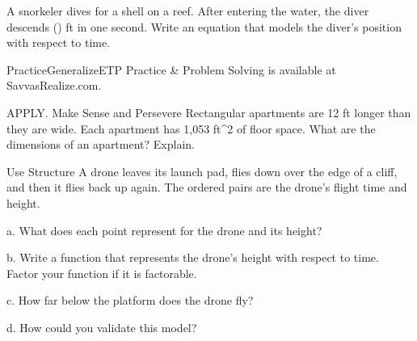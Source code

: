 \documentclass{article}
\newenvironment{practice}[2]{}{}        %
\newenvironment{te-addendum}[2]{}{}     %
\newcommand{\answer}[1]{}               %
\newcommand{\placeholder}[2]{}          %
\begin{document}
\begin{practice}{39}{3}
A snorkeler dives for a shell on a reef. After entering the water, the diver descends () ft in one second. Write an equation that models the diver's position with respect to time.
\placeholder{illustration}{Underwater reef with snorkeler shown entering at left, reaching shell on bottom center, and returning to surface at right. Black (x)-axis along water surface, arrows left and right; (y)-axis vertical near left, downward arrow and upward arrow, 0 at origin. Left pose labeled 1 sec, 0 ft; right pose labeled 11 sec, 0 ft. Fish and coral below.}
\answer{(y=(\frac{11}{27})(x-1)(x-11))}
\end{practice}
\begin{te-addendum}{Practice}{GeneralizeETP}
Practice \& Problem Solving is available at SavvasRealize.com.
\end{te-addendum}
\begin{practice}{40}{2}
APPLY. Make Sense and Persevere Rectangular apartments are 12 ft longer than they are wide. Each apartment has 1,053 ft^2 of floor space. What are the dimensions of an apartment? Explain.
\answer{39 ft by 27 ft; (x(x+12)=1053); (x^2+12x=1053); (x^2+12x-1053=0); ((x+39)(x-27)=0); (x+39=0) or (x-27=0); (x=-39) or (x=27); A dimension cannot be negative, so (x=27) ft is the width, and (x+12=39) ft is the length of each apartment.}
\end{practice}
\begin{practice}{41}{3}
Use Structure A drone leaves its launch pad, flies down over the edge of a cliff, and then it flies back up again. The ordered pairs are the drone's flight time and height.
\placeholder{illustration}{Drone flight above cliff: initial drone atop wooden platform above left cliff edge labeled (0 s, 5 m); drone to right at cliff height labeled (5 s, 0 m); next drone at same height labeled (10 s, 0 m); last at original platform height labeled (15 s, 5 m). Mountains below, no coordinate axes.}
a. What does each point represent for the drone and its height?
\answer{a. (0,5) represents the height of the platform and the beginning of the drone's flight. At (5,0) and (10,0), the drone is even with the edge of the cliff. (15,5) represents the return of the drone to the height of the platform.}
b. Write a function that represents the drone's height with respect to time. Factor your function if it is factorable.
\answer{b. (h(x)=0.1(x-5)(x-10))}
c. How far below the platform does the drone fly?
\answer{c. 5.625 m}
d. How could you validate this model?
\answer{d. The given points fit the quadratic equation. The drone's lowest point is on the line of symmetry of the parabola.}
\end{practice}
\end{document}
